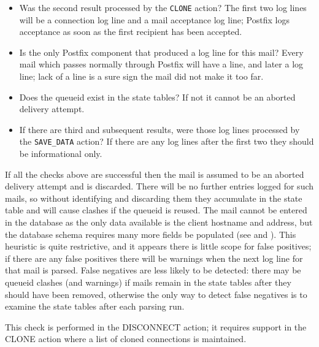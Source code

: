 \begin{itemize}

    \item Was the second result processed by the \texttt{CLONE} action?
        The first two  log lines will be a connection log
        line and a mail acceptance log line; Postfix logs acceptance as
        soon as the first recipient has been accepted.

    \item Is  the only Postfix component that produced a log
        line for this mail?  Every mail which passes normally through
        Postfix will have a  line, and later a
         log line; lack of a  line is a sure
        sign the mail did not make it too far.

    \item Does the queueid exist in the state tables?  If not it cannot be
        an aborted delivery attempt.

    \item If there are third and subsequent results, were those log lines
        processed by the \texttt{SAVE\_DATA} action?  If there are any log
        lines after the first two they should be informational only.

\end{itemize}

If all the checks above are successful then the mail is assumed to be an
aborted delivery attempt and is discarded.  There will be no further
entries logged for such mails, so without identifying and discarding them
they accumulate in the state table and will cause clashes if the queueid is
reused.  The mail cannot be entered in the database as the only data
available is the client hostname and  address, but the database
schema requires many more fields be populated (see  and ).  This heuristic is quite
restrictive, and it appears there is little scope for false positives; if
there are any false positives there will be warnings when the next log line
for that mail is parsed.  False negatives are less likely to be detected:
there may be queueid clashes (and warnings) if mails remain in the state
tables after they should have been removed, otherwise the only way to
detect false negatives is to examine the state tables after each parsing
run.

This check is performed in the DISCONNECT action; it requires support in
the CLONE action where a list of cloned connections is maintained.



